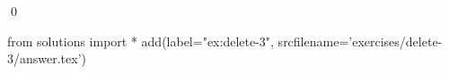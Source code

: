 
\begin{ex} 
  \label{ex:delete-3}
  
  \qed
\end{ex} 
\begin{python0}
from solutions import *
add(label="ex:delete-3",
    srcfilename='exercises/delete-3/answer.tex') 
\end{python0}
